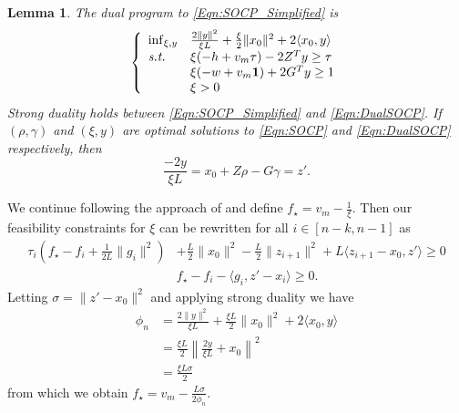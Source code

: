 \documentclass[11pt]{article}
\numberwithin{equation}{section}
\newtheorem{lemma}[thm]{Lemma}
\newcommand{\Ucoef}{\rho}
\newcommand{\Wcoef}{\gamma}
\newcommand{\ones}{\mathbf{1}}
\theoremstyle{definition}
\theoremstyle{plain}
\theoremstyle{definition}
\begin{document}
\begin{lemma}
    The dual program to \eqref{Eqn:SOCP_Simplified} is
    \begin{equation}\label{Eqn:DualSOCP}
        \left\{\begin{array}{ll}
        \inf_{\xi,y} & \frac{2\|y\|^2}{\xi L} + \frac{\xi}{2}\|x_0\|^2 + 2 \langle x_0, y \rangle \\
        \text{\emph{s.t.}} & \xi(-h + v_m \tau) - 2 Z^T y \geq \tau \\
        & \xi(-w + v_m \ones) + 2G^T y \geq 1 \\
        & \xi > 0
        \end{array} \right.
    \end{equation}
    Strong duality holds between \eqref{Eqn:SOCP_Simplified} and \eqref{Eqn:DualSOCP}. If $(\Ucoef, \Wcoef)$ and $(\xi, y)$ are optimal solutions to \eqref{Eqn:SOCP} and \eqref{Eqn:DualSOCP} respectively, then
    \begin{equation*}
        \frac{-2y}{\xi L} = x_0 + Z \Ucoef - G \Wcoef = z'.
    \end{equation*}
\end{lemma}

We continue following the approach of \cite{SPGM} and define $f_\star = v_m - \frac{1}{\xi}$. Then our feasibility constraints for $\xi$ can be rewritten for all $i \in [n-k,n-1]$ as
\begin{align}
    \tau_i\left(f_\star - f_i + \frac{1}{2L}\|g_i\|^2 \right) &+ \frac{L}{2}\|x_0\|^2 - \frac{L}{2}\|z_{i+1}\|^2 + L\langle z_{i+1} - x_0, z' \rangle \geq 0 \label{Eqn:DualFeas1} \\
    &f_\star - f_i - \langle g_i, z' - x_i \rangle \geq 0 . \label{Eqn:DualFeas2}
\end{align}
Letting $\sigma = \|z' - x_0\|^2$ and applying strong duality we have
\begin{align*}
    \phi_n &= \frac{2\|y\|^2}{\xi L} + \frac{\xi L}{2}\|x_0\|^2 + 2 \langle x_0, y \rangle \\
    & = \frac{\xi L}{2} \left\|\frac{2y}{\xi L} + x_0 \right\|^2 \\
    & = \frac{\xi L \sigma}{2}
\end{align*}
from which we obtain $f_\star = v_m - \frac{L \sigma}{2\phi_n}$.
\end{document}
